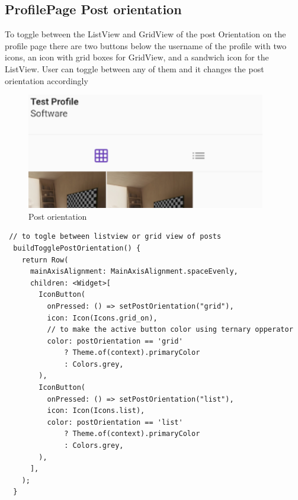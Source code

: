 \subsection{ProfilePage Post orientation}
To toggle between the ListView and GridView of the post Orientation on the profile page there are two buttons below the username of the profile with two icons, an icon with grid boxes for GridView, and a sandwich icon for the ListView. User can toggle between any of them and it changes the post orientation accordingly
\begin{figure}[!htb]
    \centering
    \includegraphics{img/postorient.PNG}
    \caption{Post orientation}
    \label{fig:Post orientation}
\end{figure}

\begin{verbatim}
 // to togle between listview or grid view of posts
  buildTogglePostOrientation() {
    return Row(
      mainAxisAlignment: MainAxisAlignment.spaceEvenly,
      children: <Widget>[
        IconButton(
          onPressed: () => setPostOrientation("grid"),
          icon: Icon(Icons.grid_on),
          // to make the active button color using ternary opperator
          color: postOrientation == 'grid'
              ? Theme.of(context).primaryColor
              : Colors.grey,
        ),
        IconButton(
          onPressed: () => setPostOrientation("list"),
          icon: Icon(Icons.list),
          color: postOrientation == 'list'
              ? Theme.of(context).primaryColor
              : Colors.grey,
        ),
      ],
    );
  }
\end{verbatim}

